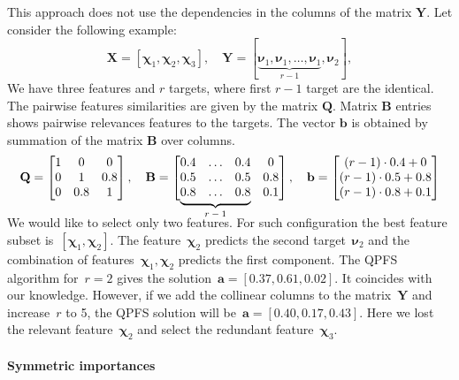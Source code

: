\documentclass[12pt,twoside]{article}
\newcommand{\ba}{\mathbf{a}}
\newcommand{\bb}{\mathbf{b}}
\newcommand{\bY}{\mathbf{Y}}
\newcommand{\bX}{\mathbf{X}}
\newcommand{\bB}{\mathbf{B}}
\newcommand{\bQ}{\mathbf{Q}}
\newcommand{\bchi}{\boldsymbol{\chi}}
\newcommand{\bnu}{\boldsymbol{\nu}}
\newcommand\undermat[2]{%
	\makebox[0pt][l]{$\smash{\underbrace{\phantom{%
					\begin{matrix}#2\end{matrix}}}_{\text{$#1$}}}$}#2}
\begin{document}
This approach does not use the dependencies in the columns of the matrix $\bY$. Let consider the following example:
\[
	\bX = [\bchi_1, \bchi_2, \bchi_3], \quad \bY = [\underbrace{\bnu_1, \bnu_1, \dots, \bnu_1}_{r-1}, \bnu_2],
\]
We have three features and $r$ targets, where first $r-1$ target are the identical.
The pairwise features similarities are given by the matrix $\bQ$.
Matrix $\bB$ entries shows pairwise relevances features to the targets.
The vector $\bb$ is obtained by summation of the matrix $\bB$ over columns.
\[
	\bQ = \begin{bmatrix} 1 & 0 & 0\\ 0 & 1 & 0.8 \\ 0 & 0.8 & 1 \end{bmatrix}, \quad
	\bB = \begin{bmatrix} 0.4 & \dots & 0.4 & 0 \\ 0.5 & \dots & 0.5 & 0.8 \\ \undermat{r-1}{0.8 & \dots & 0.8} & 0.1 \end{bmatrix}, \quad
	\bb = \begin{bmatrix} (r-1) \cdot 0.4 + 0 \\ (r-1) \cdot 0.5 + 0.8 \\ (r-1) \cdot 0.8 + 0.1 \end{bmatrix}
\]
	\vspace{0.5cm}

We would like to select only two features.
For such configuration the best feature subset is~$[\bchi_1, \bchi_2]$.
The feature~$\bchi_2$ predicts the second target~$\bnu_2$ and the combination of features~$\bchi_1, \bchi_2$ predicts the first component.
The QPFS algorithm for~$r=2$ gives the solution~$\ba = [0.37,	0.61,	0.02]$. It coincides with our knowledge.
However, if we add the collinear columns to the matrix~$\bY$ and increase~$r$ to 5, the QPFS solution will be~$\ba = [0.40,	0.17, 0.43]$.
Here we lost the relevant feature~$\bchi_2$ and select the redundant feature~$\bchi_3$.

\paragraph{Symmetric importances}
\end{document}
